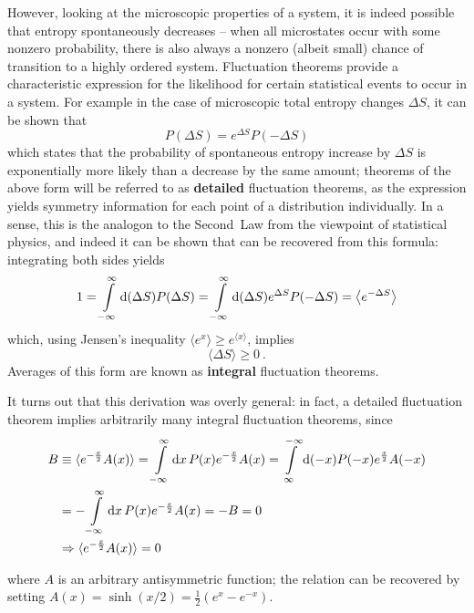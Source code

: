However, looking at the microscopic properties of a system, it is indeed possible that entropy spontaneously decreases -- when all microstates occur with some nonzero probability, there is also always a nonzero (albeit small) chance of transition to a highly ordered system. Fluctuation theorems provide a characteristic expression for the likelihood for certain statistical events to occur in a system. For example in the case of microscopic total entropy changes \(\Delta S\), it can be shown that
%
\begin{equation}
	P(\Delta S) = e^{\Delta S}P(-\Delta S)
\end{equation}
%
which states that the probability of spontaneous entropy increase by \(\Delta S\) is exponentially more likely than a decrease by the same amount; theorems of the above form will be referred to as \textbf{detailed} fluctuation theorems, as the expression yields symmetry information for each point of a distribution individually. In a sense, this is the analogon to the Second~Law from the viewpoint of statistical physics, and indeed it can be shown that  can be recovered from this formula: integrating both sides yields
%
\begin{equation}
	\label{eqn:average of exp}
	1 = \int\limits_{-\infty}^\infty \mathrm{d} (\Delta S) P(\Delta S) = \int\limits_{-\infty}^\infty \mathrm{d} (\Delta S) e^{\Delta S}P(-\Delta S) = \left\langle e^{-\Delta S} \right\rangle
\end{equation}
%
which, using Jensen's inequality \(\langle e^x\rangle \geq e^{\langle x\rangle}\), implies
%
\begin{equation}
	\langle\Delta S\rangle \geq 0 ~.
\end{equation}
%
Averages of this form are known as \textbf{integral} fluctuation theorems.

It turns out that this derivation was overly general: in fact, a detailed fluctuation theorem implies arbitrarily many integral fluctuation theorems, since
%
\begin{align}
	   B
	&\equiv \langle e^{-\frac x2}A(x)\rangle
	= \int\limits_{-\infty}^\infty\mathrm{d} x \, P(x) e^{-\frac x2}A(x)
	= \int\limits_\infty^{-\infty}\mathrm{d}(-x) P(-x) e^{\frac x2}A(-x) \notag \\
	&= - \int\limits_{-\infty}^\infty\mathrm{d} x \, P(x) e^{-\frac x2}A(x)
	 = -B
	 = 0 \notag \\
	\label{eqn:antisymmetric exp average}
	&\Rightarrow
	\langle e^{-\frac x2}A(x)\rangle = 0
\end{align}

%
where \(A\) is an arbitrary antisymmetric function; the relation  can be recovered by setting \(A(x) = \sinh(x/2) = \frac12(e^x-e^{-x})\).

